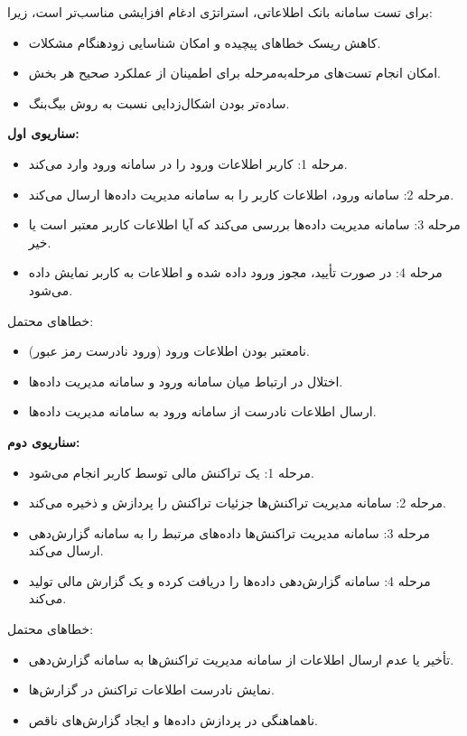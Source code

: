 برای تست سامانه بانک اطلاعاتی، استراتژی {ادغام افزایشی} مناسب‌تر است، زیرا:
\begin{itemize}
    \item کاهش ریسک خطاهای پیچیده و امکان شناسایی زودهنگام مشکلات.
    \item امکان انجام تست‌های مرحله‌به‌مرحله برای اطمینان از عملکرد صحیح هر بخش.
    \item ساده‌تر بودن اشکال‌زدایی نسبت به روش بیگ‌بنگ.
\end{itemize}

\textbf{سناریوی اول:}
\begin{itemize}
    \item {مرحله 1}: کاربر اطلاعات ورود را در سامانه ورود وارد می‌کند.
    \item {مرحله 2}: سامانه ورود، اطلاعات کاربر را به سامانه مدیریت داده‌ها ارسال می‌کند.
    \item {مرحله 3}: سامانه مدیریت داده‌ها بررسی می‌کند که آیا اطلاعات کاربر معتبر است یا خیر.
    \item {مرحله 4}: در صورت تأیید، مجوز ورود داده شده و اطلاعات به کاربر نمایش داده می‌شود.
\end{itemize}

{خطاهای محتمل:}
\begin{itemize}
    \item نامعتبر بودن اطلاعات ورود (ورود نادرست رمز عبور).
    \item اختلال در ارتباط میان سامانه ورود و سامانه مدیریت داده‌ها.
    \item ارسال اطلاعات نادرست از سامانه ورود به سامانه مدیریت داده‌ها.
\end{itemize}

\textbf{سناریوی دوم:}
\begin{itemize}
    \item {مرحله 1}: یک تراکنش مالی توسط کاربر انجام می‌شود.
    \item {مرحله 2}: سامانه مدیریت تراکنش‌ها جزئیات تراکنش را پردازش و ذخیره می‌کند.
    \item {مرحله 3}: سامانه مدیریت تراکنش‌ها داده‌های مرتبط را به سامانه گزارش‌دهی ارسال می‌کند.
    \item {مرحله 4}: سامانه گزارش‌دهی داده‌ها را دریافت کرده و یک گزارش مالی تولید می‌کند.
\end{itemize}

{خطاهای محتمل:}
\begin{itemize}
    \item تأخیر یا عدم ارسال اطلاعات از سامانه مدیریت تراکنش‌ها به سامانه گزارش‌دهی.
    \item نمایش نادرست اطلاعات تراکنش در گزارش‌ها.
    \item ناهماهنگی در پردازش داده‌ها و ایجاد گزارش‌های ناقص.
\end{itemize}


